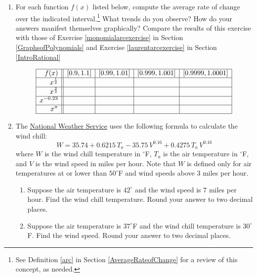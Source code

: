 \begin{enumerate}
\setcounter{enumi}{\value{HW}}

\item \label{powerarcexercise}For each function $f(x)$ listed below, compute the average rate of change over the indicated interval.\footnote{See Definition \ref{arc} in Section \ref{AverageRateofChange} for a review of this concept, as needed.}  What trends do you observe?  How do your answers manifest themselves graphically?  Compare the results of this exercise with those of Exercise \ref{monomialarcexercise} in Section \ref{GraphsofPolynomials} and Exercise \ref{laurentarcexercise} in Section \ref{IntroRational}

\[ \begin{array}{|r||c|c|c|c|}  \hline

 f(x) &  [0.9, 1.1] & [0.99, 1.01] &[0.999, 1.001] & [0.9999, 1.0001]  \\ \hline
 x^{\frac{1}{2}} &&&&  \\  \hline
 x^{\frac{2}{3}} &&&&  \\ \hline
 x^{-0.23} &&&&   \\  \hline
 x^{\pi}  &&&&   \\  \hline

\end{array} \]

\item \label{WindChillTemperature} The \href{http://www.nws.noaa.gov/om/windchill/windchillglossary.shtml}{\underline{National Weather Service}} uses the following formula to calculate the wind chill: \[ W = 35.74 + 0.6215 \, T_{a} - 35.75\, V^{0.16} + 0.4275 \, T_{a} \, V^{0.16}  \] where $W$ is the wind chill temperature in $^{\circ}$F, $T_{a}$ is the air temperature in $^{\circ}$F, and  $V$ is the wind speed in miles per hour.  Note that $W$ is defined only for air temperatures at or lower than $50^{\circ}$F and wind speeds above $3$ miles per hour.

\begin{enumerate}

\item  Suppose the air temperature is $42^{\circ}$ and the wind speed is $7$ miles per hour. Find the wind chill temperature.  Round your answer to two decimal places.

\item  Suppose the air temperature is $37^{\circ}$F and the wind chill temperature is $30^{\circ}$F.  Find the wind speed.  Round your answer to two decimal places. 


\end{enumerate}
\end{enumerate}
